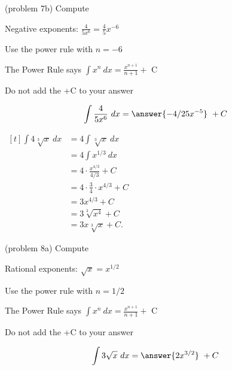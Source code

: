 \documentclass[handout]{ximera}
\begin{document}
\begin{problem}(problem 7b)
Compute 

\begin{hint}
Negative exponents: $\frac{4}{5x^6} = \frac45 x^{-6}$
\end{hint}
\begin{hint}
Use the power rule with $n=-6$
\end{hint}
\begin{hint}
The Power Rule says $\int x^n \ dx = \frac{x^{n+1}}{n+1} +$ C
\end{hint}
\begin{hint}
\begin{center}
Do not add the +C to your answer
\end{center}
\end{hint}

\[
\int \frac{4}{5x^6} \ dx =
\answer{-4/25 x^{-5}} \ + C
\]
\end{problem}


\begin{example}[example 8]
$\begin{aligned}[t]
\int 4\sqrt[3]x  \ dx &= 4 \int \sqrt[3] x \  dx  \\
&= 4 \int x^{1/3} \ dx \\
&= 4 \cdot \frac{x^{4/3}}{4/3} +C \\[3pt]
&= 4 \cdot \frac{3}{4} \cdot x^{4/3} +C \\[3pt]
&= 3x^{4/3} +C \\
&= 3\sqrt[3] {x^4} +C \\
&= 3x\sqrt[3] x +C.
\end{aligned}$
\end{example}


\begin{problem}(problem 8a)
Compute 

\begin{hint}
Rational exponents: $\sqrt x = x^{1/2}$
\end{hint}
\begin{hint}
Use the power rule with $n=1/2$
\end{hint}
\begin{hint}
The Power Rule says $\int x^n \ dx = \frac{x^{n+1}}{n+1} +$ C
\end{hint}
\begin{hint}
\begin{center}
Do not add the +C to your answer
\end{center}
\end{hint}

\[
\int 3\sqrt x \ dx =
\answer{2x^{3/2}} \ + C
\]
\end{problem}
\end{document}
